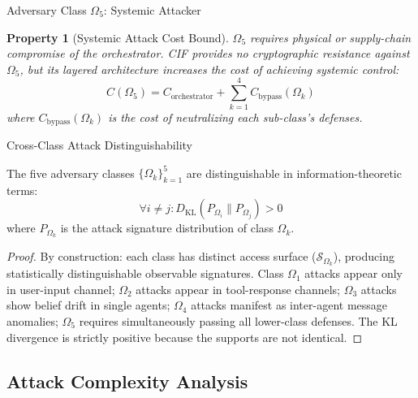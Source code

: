 \documentclass[
  ignorenonframetext,
]{beamer}
\newtheorem{property}{Property}
\begin{document}
\begin{frame}[allowframebreaks]{Adversary Class \(\Omega_5\): Systemic
Attacker}
\begin{property}[Systemic Attack Cost Bound]
\label{prop:omega5-scope}
$\Omega_5$ requires physical or supply-chain compromise of the orchestrator. CIF provides no cryptographic resistance against $\Omega_5$, but its layered architecture increases the cost of achieving systemic control:
\begin{equation}
\label{eq:omega5-cost}
C(\Omega_5) = C_{\text{orchestrator}} + \sum_{k=1}^{4} C_{\text{bypass}}(\Omega_k)
\end{equation}
where $C_{\text{bypass}}(\Omega_k)$ is the cost of neutralizing each sub-class's defenses.
\end{property}
\end{frame}

\begin{frame}[allowframebreaks]{Cross-Class Attack Distinguishability}
\protect{}\label{cross-class-attack-distinguishability}
\begin{theorem}
\label{thm:class-separation}
The five adversary classes $\{\Omega_k\}_{k=1}^5$ are distinguishable in information-theoretic terms:
\begin{equation}
\label{eq:class-separation}
\forall i \neq j: D_{\mathrm{KL}}(P_{\Omega_i} \| P_{\Omega_j}) > 0
\end{equation}
where $P_{\Omega_k}$ is the attack signature distribution of class $\Omega_k$.
\end{theorem}

\begin{proof}
By construction: each class has distinct access surface ($\mathcal{S}_{\Omega_k}$), producing statistically distinguishable observable signatures. Class $\Omega_1$ attacks appear only in user-input channel; $\Omega_2$ attacks appear in tool-response channels; $\Omega_3$ attacks show belief drift in single agents; $\Omega_4$ attacks manifest as inter-agent message anomalies; $\Omega_5$ requires simultaneously passing all lower-class defenses. The KL divergence is strictly positive because the supports are not identical.
\end{proof}
\end{frame}

\subsection{Attack Complexity Analysis}\label{sec:attack-complexity}
\end{document}
